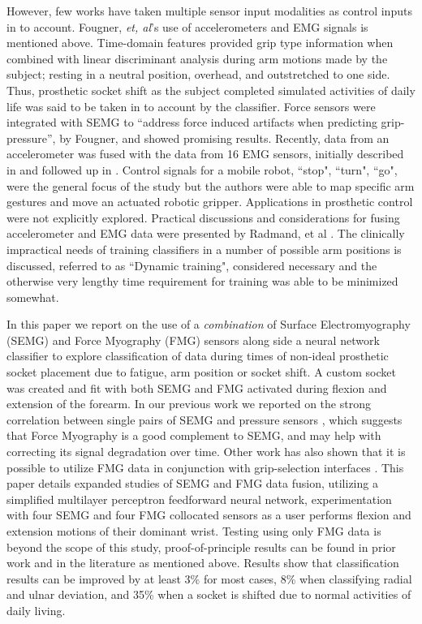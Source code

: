 \documentclass[twocolumn]{sagej}
\begin{document}
However, few works have taken multiple sensor input modalities as control inputs in to account.  Fougner, \textit{et, al}'s use of accelerometers and EMG signals is mentioned above.  Time-domain features provided grip type information when combined with linear discriminant analysis during arm motions made by the subject; resting in a neutral position, overhead, and outstretched to one side.\cite{Fougner2011}  Thus, prosthetic socket shift as the subject completed simulated activities of daily life was said to be taken in to account by the classifier.  Force sensors were integrated with SEMG to ``address force induced artifacts when predicting grip-pressure'', by Fougner, \cite{Fougner02008} and showed promising results.  Recently, data from an  accelerometer was fused with the data from 16 EMG sensors, initially described in \cite{Assad2013} and followed up in \cite{Wolf02013}.  Control signals for a mobile robot, ``stop", ``turn", ``go", were the general focus of the study but the authors were able to  map specific arm gestures and move an actuated robotic gripper\cite{Wolf02013}.  Applications in prosthetic control were not explicitly  explored. Practical discussions and considerations for fusing accelerometer and EMG data were presented by Radmand, et al \cite{Radmand02014}.  The clinically impractical needs of training classifiers in a number of possible arm positions is discussed, referred to as ``Dynamic training", considered necessary and the otherwise very lengthy time requirement for training was able to be minimized somewhat.  \par \noindent
In this paper we report on the use of a \textit{combination} of Surface Electromyography (SEMG) and Force Myography (FMG) sensors along side a neural network classifier to explore classification of data during times of non-ideal prosthetic socket placement due to fatigue, arm position or socket shift.  A  custom  socket  was created  and fit with both SEMG and FMG activated during flexion and extension of the forearm. In our previous work we reported on the strong correlation between single pairs of SEMG and pressure sensors \cite{SanfordSPIE2015a}, which suggests that Force Myography is a good complement to SEMG, and may help with correcting its signal degradation over time.  Other work has also shown that it is possible to utilize FMG data in conjunction with grip-selection interfaces \cite{SanfordPETRA02015}.  This paper details expanded studies of SEMG and FMG data fusion, utilizing a simplified multilayer perceptron feedforward neural network, experimentation with four SEMG and four FMG collocated sensors as a user performs flexion and extension motions of their dominant wrist.  Testing using only FMG data is beyond the scope of this study, proof-of-principle results can be found in prior work \cite{SanfordSPIE2015a, SanfordPETRA02015} and in the literature as mentioned above. Results show that classification results can be improved by at least 3\% for most cases, 8\% when classifying radial and ulnar deviation, and 35\% when a socket is shifted due to normal activities of daily living. \par \noindent
\end{document}
